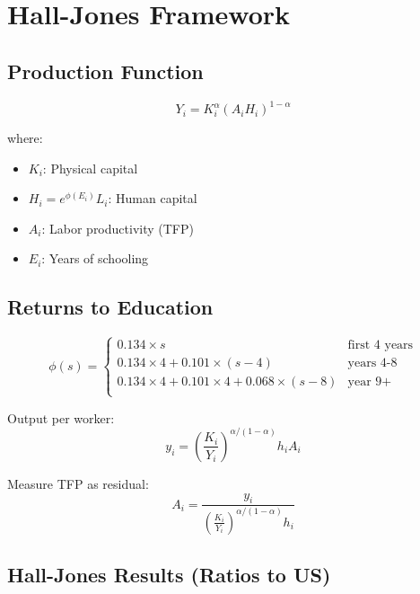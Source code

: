 \documentclass[a4paper,11pt]{article}
\begin{document}
\section{Hall-Jones Framework}

\subsection*{Production Function}

\[
Y_i = K_i^\alpha (A_i H_i)^{1-\alpha}
\tag{HJ-Production}
\]

where:
\begin{itemize}
    \item $K_i$: Physical capital
    \item $H_i = e^{\phi(E_i)}L_i$: Human capital
    \item $A_i$: Labor productivity (TFP)
    \item $E_i$: Years of schooling
\end{itemize}

\subsection*{Returns to Education}

\[
\phi(s) = 
\begin{cases}
0.134 \times s & \text{first 4 years} \\
0.134 \times 4 + 0.101 \times (s-4) & \text{years 4-8} \\
0.134 \times 4 + 0.101 \times 4 + 0.068 \times (s-8) & \text{year 9+} \\
\end{cases}
\tag{Returns-Education}
\]

Output per worker:
\[
y_i = \left(\frac{K_i}{Y_i}\right)^{\alpha/(1-\alpha)} h_i A_i
\tag{HJ-PerWorker}
\]

Measure TFP as residual:
\[
A_i = \frac{y_i}{\left(\frac{K_i}{Y_i}\right)^{\alpha/(1-\alpha)}h_i}
\tag{HJ-TFP}
\]

\subsection*{Hall-Jones Results (Ratios to US)}
\end{document}
